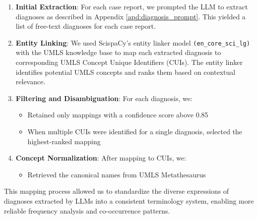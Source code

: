 \begin{enumerate}
    \item \textbf{Initial Extraction}: For each case report, we prompted the LLM to extract diagnoses as described in Appendix \ref{apd:diagnosis_prompt}. 
    This yielded a list of free-text diagnoses for each case report.
    \item \textbf{Entity Linking}: We used ScispaCy's entity linker model 
    \texttt{(en\_core\_sci\_lg)} with the UMLS knowledge base to map each extracted diagnosis to corresponding UMLS Concept Unique Identifiers (CUIs). 
    The entity linker identifies potential UMLS concepts and ranks them based on contextual relevance.
    \item \textbf{Filtering and Disambiguation}: For each diagnosis, we:
    \begin{itemize}
       \item Retained only mappings with a confidence score above 0.85
       \item When multiple CUIs were identified for a single diagnosis, selected the highest-ranked mapping
    \end{itemize}
    \item \textbf{Concept Normalization}: After mapping to CUIs, we:
\begin{itemize}
   \item Retrieved the canonical names from UMLS Metathesaurus
\end{itemize}
\end{enumerate}


This mapping process allowed us to standardize the diverse expressions of diagnoses extracted by LLMs into a consistent terminology system, enabling more reliable frequency analysis and co-occurrence patterns. 





